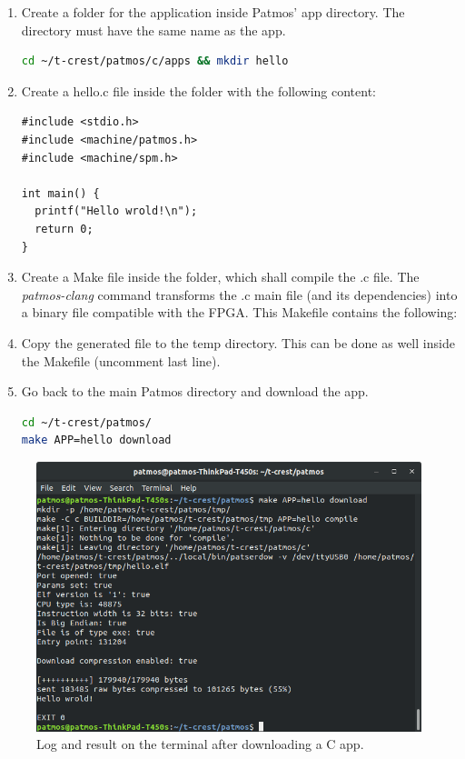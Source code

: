 \begin{enumerate}
    \item Create a folder for the application inside Patmos' app directory. The directory must have the same name as the app.
\lstset{style=Bstyle}
\begin{lstlisting}[language=bash]
cd ~/t-crest/patmos/c/apps && mkdir hello   
\end{lstlisting} 
    \item Create a hello.c file inside the folder with the following content:
\lstset{style=Cstyle}
\begin{lstlisting}
#include <stdio.h>
#include <machine/patmos.h>
#include <machine/spm.h>

int main() {
  printf("Hello wrold!\n");
  return 0;
}      
\end{lstlisting} 
    \item Create a Make file inside the folder, which shall compile the .c file. The \textit{patmos-clang} command transforms the .c main file (and its dependencies) into a binary file compatible with the FPGA. This Makefile contains the following:
\lstset{style=OtherSt}
    
    \item Copy the generated file to the temp directory. This can be done as well inside the Makefile (uncomment last line).
    \item Go back to the main Patmos directory and download the app.
\lstset{style=Bstyle}
\begin{lstlisting}[language=bash]
cd ~/t-crest/patmos/
make APP=hello download
\end{lstlisting} 

\end{enumerate}

\begin{figure}[H]
    \centering
        \includegraphics[scale=0.5]{Figures/setup/hello_example.png}
    \caption{Log and result on the terminal after downloading a C app.}
    \label{fig:c_app}
\end{figure}


